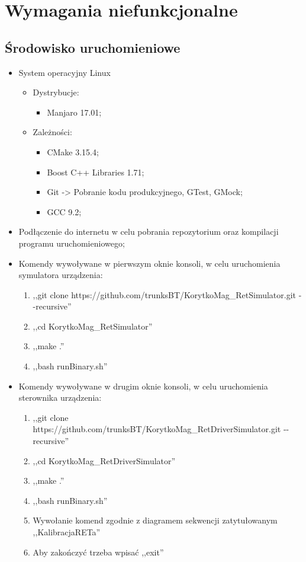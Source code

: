 \chapter{Wymagania niefunkcjonalne}
\section{Środowisko uruchomieniowe}
	\begin{itemize}
		\item System operacyjny Linux
			\begin{itemize}
				\item Dystrybucje:
				\begin{itemize}
					\item Manjaro 17.01;
				\end{itemize}
				\item Zależności:
					\begin{itemize}
						\item CMake 3.15.4;
						\item Boost C++ Libraries 1.71;
						\item Git -> Pobranie kodu produkcyjnego, GTest, GMock;
						\item GCC 9.2;
					\end{itemize}
			\end{itemize}
		\item Podłączenie do internetu w celu pobrania repozytorium oraz kompilacji programu uruchomieniowego;
		\item Komendy wywoływane w pierwszym oknie konsoli, w celu uruchomienia symulatora urządzenia:
		\begin{enumerate}
			\item ,,git clone https://github.com/trunksBT/KorytkoMag\_RetSimulator.git -{}-recursive''
			\item ,,cd KorytkoMag\_RetSimulator''
			\item ,,make .''
			\item ,,bash runBinary.sh''
		\end{enumerate}
		\item Komendy wywoływane w drugim oknie konsoli, w celu uruchomienia sterownika urządzenia:
		\begin{enumerate}
			\item ,,git clone https://github.com/trunksBT/KorytkoMag\_RetDriverSimulator.git -{}-recursive''
			\item ,,cd KorytkoMag\_RetDriverSimulator''
			\item ,,make .''
			\item ,,bash runBinary.sh''
			\item Wywołanie komend zgodnie z diagramem sekwencji zatytułowanym ,,KalibracjaRETa''
			\item Aby zakończyć trzeba wpisać ,,exit''
		\end{enumerate}
	\end{itemize}
